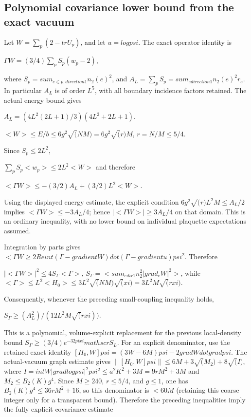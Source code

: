 \documentclass[
  11pt,
]{article}
\begin{document}
\subsection{Polynomial covariance lower bound from the exact
vacuum}\label{polynomial-covariance-lower-bound-from-the-exact-vacuum}

Let \(W=\sum_p(2-tr U_p)\), and let \(u=log psi\). The exact operator
identity is

\(\Gamma W = (3/4) \sum_p S_p (w_p-2)\),

where \(S_p=sum_{e \in p, direction 1} n_2(e)^2\), and
\(A_L=\sum_p S_p=sum_{e direction 1} n_2(e)^2 r_e\). In particular
\(A_L\) is of order \(L^5\), with all boundary incidence factors
retained. The actual energy bound gives

\(A_L = (4 L^2(2L+1)/3)(4L^2+2L+1)\).

\(<W> \le  E/b \le  6 g^2 \sqrt(N M) = 6 g^2 \sqrt(r) M\),
\(r=N/M\le 5/4\).

Since \(S_p \le  2 L^2\),

\(\sum_p S_p <w_p> \le  2 L^2 <W>\) and therefore

\(<\Gamma W> \le  -(3/2)A_L + (3/2)L^2 <W>\).

Using the displayed energy estimate, the explicit condition
\(6 g^2 \sqrt(r) L^2 M \le  A_L/2\) implies \(<\Gamma W> \le  -3A_L/4\);
hence \(|<\Gamma W>| \ge  3A_L/4\) on that domain. This is an ordinary
inequality, with no lower bound on individual plaquette expectations
assumed.

Integration by parts gives
\(<\Gamma W\ge 2 Re int (\Gamma-gradient W) dot (\Gamma-gradient u) psi^2\).
Therefore

\(|<\Gamma W>|^2 \le  4 S_\Gamma <\Gamma>\),
\(S_\Gamma=<sum_{e dir1} n_2^2 |grad_e W|^2>\), while
\(<\Gamma> \le  L^2 <H_0> \le  3 L^2 \sqrt(NM) \sqrt(xi) = 3 L^2 M \sqrt(r xi)\).

Consequently, whenever the preceding small-coupling inequality holds,

\(S_\Gamma \ge  (A_L^2)/(12 L^2 M \sqrt(r xi))\).

This is a polynomial, volume-explicit replacement for the previous
local-density bound \(S_\Gamma \ge  (3/4)e^{-32 pi xi} mathscr S_L\).
For an explicit denominator, use the retained exact identity
\([H_0,W]psi=(3W-6M)psi-2 grad W dot grad psi\). The actual-vacuum graph
estimate gives \(\|[H_0,W]psi\| \le  6M+3 \sqrt(M_2)+8 \sqrt(I)\), where
\(I=int W |grad log psi|^2 psi^2 \le  a^2 K^2+3M = 9rM^2+3M\) and
\(M_2\le B_2(K)g^4\). Since \(M\ge 240\), \(r\le 5/4\), and \(g\le 1\),
one has \(B_2(K)g^4 \le  36rM^2+16\), so this denominator is \(<60M\)
(retaining this coarse integer only for a transparent bound). Therefore
the preceding inequalities imply the fully explicit covariance estimate
\end{document}
